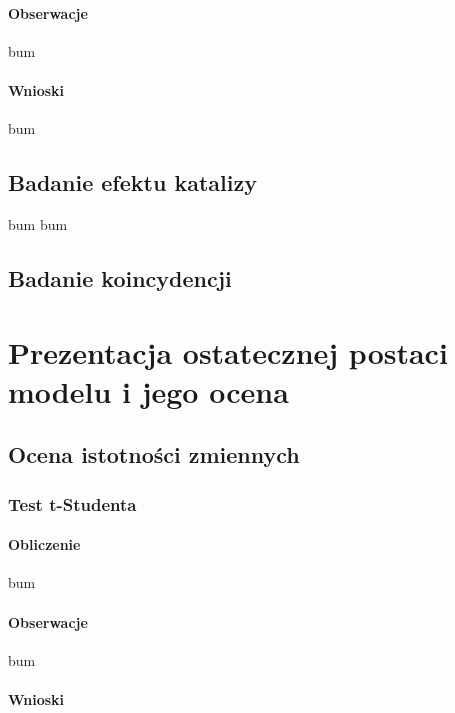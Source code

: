 \documentclass[
  11pt,
]{article}
\begin{document}
\paragraph{Obserwacje}\label{obserwacje-15}

bum

\paragraph{Wnioski}\label{wnioski-15}

bum

\subsection{Badanie efektu katalizy}\label{badanie-efektu-katalizy}

bum bum

\subsection{Badanie koincydencji}\label{badanie-koincydencji}

\section{Prezentacja ostatecznej postaci modelu i jego
ocena}\label{prezentacja-ostatecznej-postaci-modelu-i-jego-ocena}

\subsection{Ocena istotności
zmiennych}\label{ocena-istotnoux15bci-zmiennych}

\subsubsection{Test t-Studenta}\label{test-t-studenta}

\paragraph{Obliczenie}\label{obliczenie-12}

bum

\paragraph{Obserwacje}\label{obserwacje-16}

bum

\paragraph{Wnioski}\label{wnioski-16}
\end{document}
